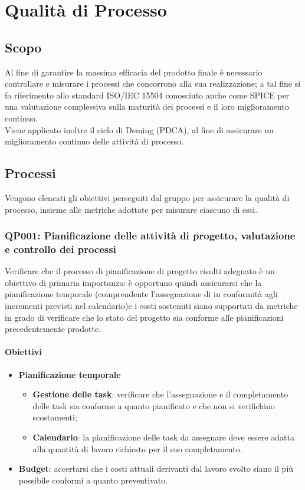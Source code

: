 \chapter{Qualità di Processo}
\label{processo} 
\section{Scopo}
Al fine di garantire la massima efficacia del prodotto finale è necessario controllare e misurare i processi che concorrono alla sua realizzazione; a tal fine si fa riferimento allo standard ISO/IEC 15504 conosciuto anche come SPICE per una valutazione complessiva sulla maturità dei processi e il loro miglioramento continuo.\\
Viene applicato inoltre il ciclo di Deming (PDCA), al fine di assicurare un miglioramento continuo delle attività di processo. 

\section{Processi}
Vengono elencati gli obiettivi perseguiti dal gruppo per assicurare la qualità di processo, insieme alle metriche adottate per misurare ciascuno di essi.
\subsection{QP001: Pianificazione delle attività di progetto, valutazione e controllo dei processi}
Verificare che il processo di pianificazione di progetto risulti adeguato è un obiettivo di primaria importanza: è opportuno quindi assicurarsi che la pianificazione temporale (comprendente l'assegnazione di  in conformità agli incrementi previsti nel calendario)e i costi sostenuti siano supportati da metriche in grado di verificare che lo stato del progetto sia conforme alle pianificazioni precedentemente prodotte.


\subsubsection{Obiettivi}
\begin{itemize}
	\item \textbf{Pianificazione temporale}
	\begin{itemize}
		\item \textbf{Gestione delle task}: verificare che l'assegnazione e il completamento delle task sia conforme a quanto pianificato e che non si verifichino scostamenti;
		\item \textbf{Calendario}: la pianificazione delle task da assegnare deve essere adatta alla quantità di lavoro richiesto per il suo completamento.
	\end{itemize}
	\item \textbf{Budget}: accertarsi che i costi attuali derivanti dal lavoro svolto siano il più possibile conformi a quanto preventivato.
\end{itemize}
